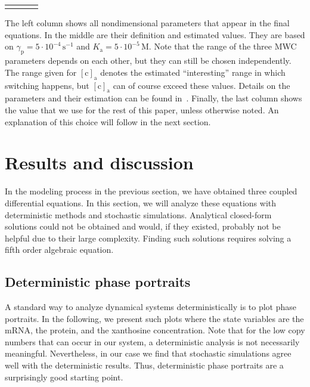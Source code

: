 \documentclass[10pt,letterpaper]{article}
\newlength\savedwidth
\newcommand\thickhline{\noalign{\global\savedwidth\arrayrulewidth\global\arrayrulewidth 2pt}%
	\hline
	\noalign{\global\arrayrulewidth\savedwidth}}
\newcommand{\unit}[1]{\,\mathrm{#1}}
\newcommand{\n}[1]{\mathrm{#1}}
\begin{document}
\begin{table}
\begin{tabular}{rllr}
			\thickhline
		\end{tabular}
		\begin{flushleft} 
			The left column shows all nondimensional parameters that appear in
			the final equations. In the middle are their definition and
			estimated values. They are based on $\gamma_{\n{p}} = 5 \cdot
			10^{-4} \unit{s^{-1}}$ and $K_{\n{a}} = 5 \cdot 10^{-5} \unit{M}$.
			Note that the range of the three MWC parameters depends on each
			other, but they can still be chosen independently. The range given
			for $\n{[c]_{a}}$ denotes the estimated ``interesting'' range in
			which switching happens, but $\n{[c]_{a}}$ can of course exceed
			these values. Details on the parameters and their estimation can be
			found in~. Finally, the last column shows the value
			that we use for the rest of this paper, unless otherwise noted. An
			explanation of this choice will follow in the next section.
		\end{flushleft}
		\label{table1:nondim}
	\end{table}
	
	
	\section*{Results and discussion}
	In the modeling process in the previous section, we have obtained three
	coupled differential equations. In this section, we will analyze these
	equations with deterministic methods and stochastic simulations. Analytical
	closed-form solutions could not be obtained and would, if they existed,
	probably not be helpful due to their large complexity. Finding such
	solutions requires solving a fifth order algebraic equation.
	
	\subsection*{Deterministic phase portraits}
	A standard way to analyze dynamical systems deterministically is
	to plot phase portraits. In the following, we present such plots where the
	state variables are the mRNA, the protein, and the xanthosine concentration. Note that for the low copy numbers that can occur in our system, a deterministic analysis is not necessarily meaningful. Nevertheless, in our case we find that stochastic simulations agree well with the deterministic results. Thus, deterministic phase portraits are a surprisingly good starting point.
	
\end{document}
